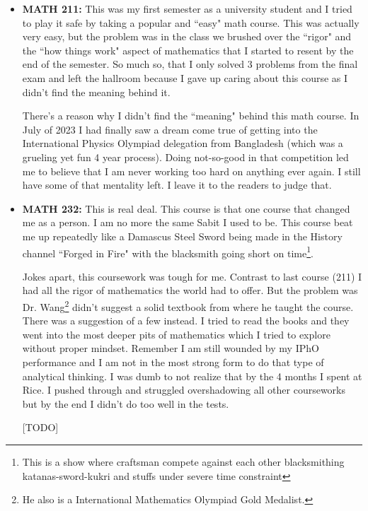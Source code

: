 \documentclass[letter]{article}
\begin{document}
\begin{itemize}
	\item \textbf{MATH 211:} This was my first semester as a university student and I tried to play it safe by taking a popular and ``easy" math course. This was actually very easy, but the problem was in the class we brushed over the ``rigor" and the ``how things work" aspect of mathematics that I started to resent by the end of the semester. So much so, that I only solved 3 problems from the final exam and left the hallroom because I gave up caring about this course as I didn't find the meaning behind it. 

		There's a reason why I didn't find the ``meaning" behind this math course. In July of 2023 I had finally saw a dream come true of getting into the International Physics Olympiad delegation from Bangladesh (which was a grueling yet fun 4 year process). Doing not-so-good in that competition led me to believe that I am never working too hard on anything ever again. I still have some of that mentality left. I leave it to the readers to judge that. 

	\item \textbf{MATH 232:} This is real deal. This course is that one course that changed me as a person. I am no more the same Sabit I used to be. This course beat me up repeatedly like a Damascus Steel Sword being made in the History channel ``Forged in Fire" with the blacksmith going short on time\footnote{This is a show where craftsman compete against each other blacksmithing katanas-sword-kukri and stuffs under severe time constraint}. 

		Jokes apart, this coursework was tough for me. Contrast to last course (211) I had all the rigor of mathematics the world had to offer. But the problem was Dr. Wang\footnote{He also is a International Mathematics Olympiad Gold Medalist.} didn't suggest a solid textbook from where he taught the course. There was a suggestion of a few instead. I tried to read the books and they went into the most deeper pits of mathematics which I tried to explore without proper mindset. Remember I am still wounded by my IPhO performance and I am not in the most strong form to do that type of analytical thinking. I was dumb to not realize that by the 4 months I spent at Rice. I pushed through and struggled overshadowing all other courseworks but by the end I didn't do too well in the tests. 

		[TODO] 


\end{itemize}
\end{document}
